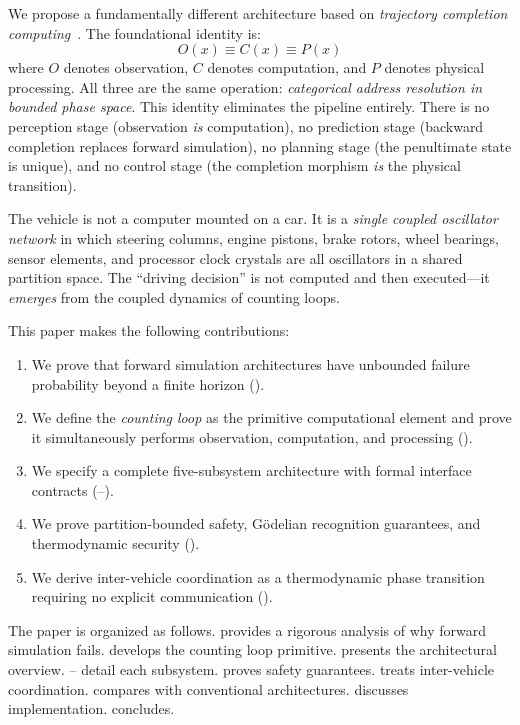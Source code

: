 \documentclass[twocolumn,10pt]{article}
\theoremstyle{definition}
\begin{document}
We propose a fundamentally different architecture based on \emph{trajectory completion computing}~\cite{sachikonye2026trajectory,sachikonye2026backward}. The foundational identity is:
\begin{equation}
\boxed{O(x) \equiv C(x) \equiv P(x)}
\label{eq:fundamental-identity}
\end{equation}
where $O$ denotes observation, $C$ denotes computation, and $P$ denotes physical processing. All three are the same operation: \emph{categorical address resolution in bounded phase space}. This identity eliminates the pipeline entirely. There is no perception stage (observation \emph{is} computation), no prediction stage (backward completion replaces forward simulation), no planning stage (the penultimate state is unique), and no control stage (the completion morphism \emph{is} the physical transition).

The vehicle is not a computer mounted on a car. It is a \emph{single coupled oscillator network} in which steering columns, engine pistons, brake rotors, wheel bearings, sensor elements, and processor clock crystals are all oscillators in a shared partition space. The ``driving decision'' is not computed and then executed---it \emph{emerges} from the coupled dynamics of counting loops.

This paper makes the following contributions:
\begin{enumerate}[leftmargin=*]
\item We prove that forward simulation architectures have unbounded failure probability beyond a finite horizon ().
\item We define the \emph{counting loop} as the primitive computational element and prove it simultaneously performs observation, computation, and processing ().
\item We specify a complete five-subsystem architecture with formal interface contracts (--).
\item We prove partition-bounded safety, G\"{o}delian recognition guarantees, and thermodynamic security ().
\item We derive inter-vehicle coordination as a thermodynamic phase transition requiring no explicit communication ().
\end{enumerate}

The paper is organized as follows.  provides a rigorous analysis of why forward simulation fails.  develops the counting loop primitive.  presents the architectural overview. -- detail each subsystem.  proves safety guarantees.  treats inter-vehicle coordination.  compares with conventional architectures.  discusses implementation.  concludes.
\end{document}
